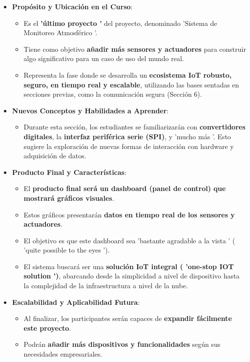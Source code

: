 \documentclass{report}
\begin{document}
\begin{itemize}
    \item \textbf{Propósito y Ubicación en el Curso}:
    \begin{itemize}
        \item Es el \textbf{ 'último proyecto '} del proyecto, denominado  'Sistema de Monitoreo Atmosférico '.
        \item Tiene como objetivo \textbf{añadir más sensores y actuadores} para construir algo significativo para un caso de uso del mundo real.
        \item Representa la fase donde se desarrolla un \textbf{ecosistema IoT robusto, seguro, en tiempo real y escalable}, utilizando las bases 
        sentadas en secciones previas, como la comunicación segura (Sección 6).
    \end{itemize}
    \item \textbf{Nuevos Conceptos y Habilidades a Aprender}:
    \begin{itemize}
        \item Durante esta sección, los estudiantes se familiarizarán con \textbf{convertidores digitales}, la \textbf{interfaz periférica serie 
        (SPI)}, y  'mucho más '. Esto sugiere la exploración de nuevas formas de interacción con hardware y adquisición de datos.
    \end{itemize}
    \item \textbf{Producto Final y Características}:
    \begin{itemize}
        \item El \textbf{producto final será un dashboard (panel de control) que mostrará gráficos visuales}.
        \item Estos gráficos presentarán \textbf{datos en tiempo real de los sensores y actuadores}.
        \item El objetivo es que este dashboard sea  'bastante agradable a la vista ' ( 'quite possible to the eyes ').
        \item El sistema buscará ser una \textbf{solución IoT integral ( 'one-stop IOT solution ')}, abarcando desde la simplicidad a nivel de 
        dispositivo hasta la complejidad de la infraestructura a nivel de la nube.
    \end{itemize}
    \item \textbf{Escalabilidad y Aplicabilidad Futura}:
    \begin{itemize}
        \item Al finalizar, los participantes serán capaces de \textbf{expandir fácilmente este proyecto}.
        \item Podrán \textbf{añadir más dispositivos y funcionalidades} según sus necesidades empresariales.
    \end{itemize}
\end{itemize}
\end{document}
